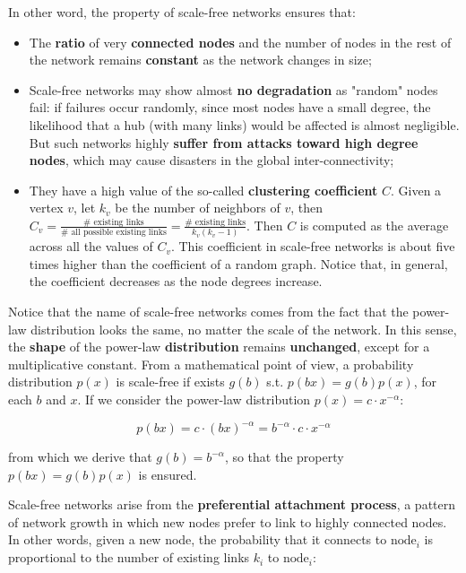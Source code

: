 In other word, the property of scale-free networks ensures that:

\begin{itemize}
    \item The \textbf{ratio} of very \textbf{connected nodes} and the number of nodes in the rest of the network remains \textbf{constant} as the network changes in size;
    \item Scale-free networks may show almost \textbf{no degradation} as "random" nodes fail: if failures occur randomly, since most nodes have a small degree, the likelihood that a hub (with many links) would be affected is almost negligible. But such networks highly \textbf{suffer from attacks toward high degree nodes}, which may cause disasters in the global inter-connectivity;
    \item They have a high value of the so-called \textbf{clustering coefficient} $C$. Given a vertex $v$, let $k_v$ be the number of neighbors of $v$, then $C_v = \frac{\text{# existing links}}{\text{# all possible existing links}} = \frac{\text{# existing links}}{k_v (k_v - 1)}$. Then $C$ is computed as the average across all the values of $C_v$. This coefficient in scale-free networks is about five times higher than the coefficient of a random graph. Notice that, in general, the coefficient decreases as the node degrees increase.
\end{itemize}

Notice that the name of scale-free networks comes from the fact that the power-law distribution looks the same, no matter the scale of the network. In this sense, the \textbf{shape} of the power-law \textbf{distribution} remains \textbf{unchanged}, except for a multiplicative constant. From a mathematical point of view, a probability distribution $p(x)$ is scale-free if exists $g(b)$ s.t. $p(bx) = g(b) p(x)$, for each $b$ and $x$. If we consider the power-law distribution $p(x) = c \cdot x^{-\alpha}$:

$$
p(bx) = c \cdot (bx)^{-\alpha} = b^{-\alpha} \cdot c \cdot x^{-\alpha}
$$

from which we derive that $g(b) = b^{-\alpha}$, so that the property $p(bx) = g(b) p(x)$ is ensured.

Scale-free networks arise from the \textbf{preferential attachment process}, a pattern of network growth in which new nodes prefer to link to highly connected nodes. In other words, given a new node, the probability that it connects to $\text{node}_i$ is proportional to the number of existing links $k_i$ to $\text{node}_i$:

